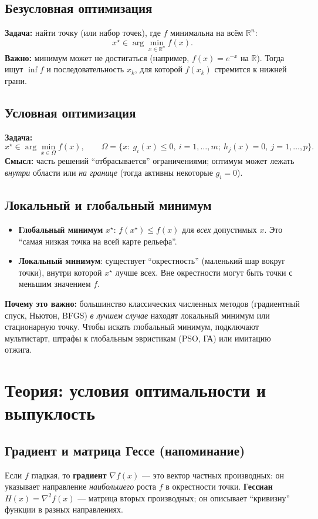 \documentclass[12pt,a4paper]{article}
\newcommand{\R}{\mathbb{R}}
\newcommand{\grad}{\nabla}
\begin{document}
\subsection{Безусловная оптимизация}
\textbf{Задача:} найти точку (или набор точек), где \(f\) минимальна на всём \(\R^n\):
\[
  x^\star \in \arg\min_{x \in \R^n} f(x).
\]
\textbf{Важно:} минимум может не достигаться (например, \(f(x)=e^{-x}\) на \(\R\)). Тогда ищут \(\inf f\) и последовательность \(x_k\), для которой \(f(x_k)\) стремится к нижней грани.

\subsection{Условная оптимизация}
\textbf{Задача:}
\[
  x^\star \in \arg\min_{x \in \Omega} f(x),\qquad
  \Omega=\{x:\ g_i(x)\le 0,\ i=1,\ldots,m;\ h_j(x)=0,\ j=1,\ldots,p\}.
\]
\textbf{Смысл:} часть решений ``отбрасывается'' ограничениями; оптимум может лежать \emph{внутри} области или \emph{на границе} (тогда активны некоторые \(g_i=0\)).

\subsection{Локальный и глобальный минимум}
\begin{itemize}
  \item \textbf{Глобальный минимум} \(x^\star\): \(f(x^\star)\le f(x)\) для \emph{всех} допустимых \(x\). Это ``самая низкая точка на всей карте рельефа''.
  \item \textbf{Локальный минимум}: существует ``окрестность'' (маленький шар вокруг точки), внутри которой \(x^\star\) лучше всех. Вне окрестности могут быть точки с меньшим значением \(f\).
\end{itemize}
\textbf{Почему это важно:} большинство классических численных методов (градиентный спуск, Ньютон, BFGS) \emph{в лучшем случае} находят локальный минимум или стационарную точку. Чтобы искать глобальный минимум, подключают мультистарт, штрафы к глобальным эвристикам (PSO, ГА) или имитацию отжига.

\section{Теория: условия оптимальности и выпуклость}

\subsection{Градиент и матрица Гессе (напоминание)}
Если \(f\) гладкая, то \textbf{градиент} \(\grad f(x)\) --- это вектор частных производных: он указывает направление \emph{наибольшего} роста \(f\) в окрестности точки. \textbf{Гессиан} \(H(x)=\nabla^2 f(x)\) --- матрица вторых производных; он описывает ``кривизну'' функции в разных направлениях.
\end{document}
